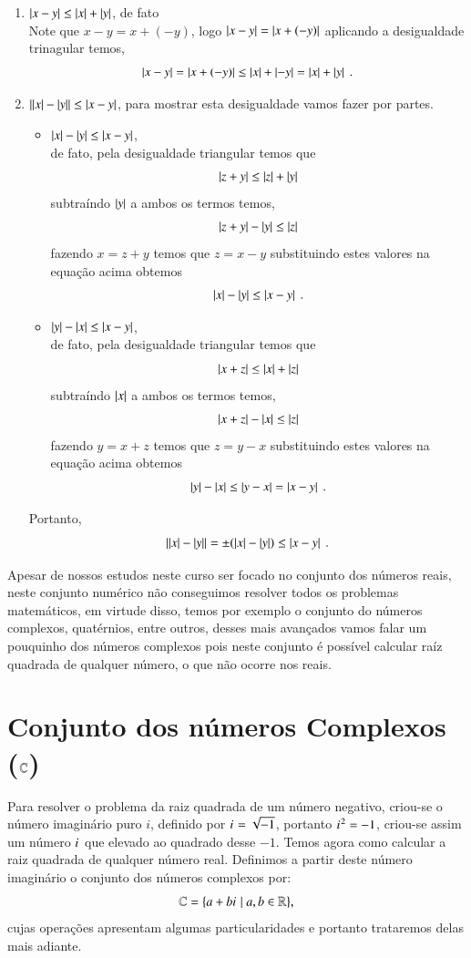 \begin{prop}
\begin{enumerate}
 \item $\left|x-y\right| \leq \left|x\right| + \left|y\right|$, de fato \\
 Note que $x-y= x+ (-y)$, logo $\left|x-y\right|= \left|x+ (-y)\right|$ aplicando a desigualdade trinagular temos,
 \[\left|x-y\right|= \left|x+ (-y)\right| \leq \left|x\right| + \left|-y\right|= \left|x\right| + \left|y\right| \ .\]
 
 \item $\left|\left|x\right| - \left|y\right|\right| \leq \left|x - y\right|$, para mostrar esta desigualdade vamos fazer por partes.
 \begin{itemize}
 \item $\left|x\right| - \left|y\right| \leq \left|x - y\right|$, \\
 de fato, pela desigualdade triangular temos que
 \[\left|z+y\right| \leq \left|z\right| + \left|y\right|\]
 subtraíndo $\left|y\right|$ a ambos os termos temos,
 \[\left|z+y\right| - \left|y\right| \leq \left|z\right|\]
 fazendo $x= z+y$ temos que $z=x-y$ substituindo estes valores na equação acima obtemos
 \[\abs{x} - \abs{y} \leq \abs{x-y} \ . \]
 \item $\left|y\right| - \left|x\right| \leq \left|x - y\right|$, \\
 de fato, pela desigualdade triangular temos que
 \[\left|x+z\right| \leq \left|x\right| + \left|z\right|\]
 subtraíndo $\left|x\right|$ a ambos os termos temos,
 \[\left|x+z\right| - \left|x\right| \leq \left|z\right|\]
 fazendo $y= x+z$ temos que $z=y-x$ substituindo estes valores na equação acima obtemos
 \[\abs{y} - \abs{x} \leq \abs{y-x}= \abs{x-y} \ . \] 
 \end{itemize}
 
 Portanto, 
 \[ \left|\left|x\right| - \left|y\right|\right| = \pm (\left|x\right| - \left|y\right|) \leq \left|x-y\right| \ .\]

\end{enumerate}
\end{prop}




Apesar de nossos estudos neste curso ser focado no conjunto dos números reais, neste conjunto numérico não conseguimos resolver todos os problemas matemáticos, em virtude disso, temos por exemplo o conjunto do números complexos, quatérnios, entre outros, desses mais avançados vamos falar um pouquinho dos números complexos pois neste conjunto é possível calcular raíz quadrada de qualquer número, o que não ocorre nos reais.

\section{Conjunto dos números Complexos (\texorpdfstring{$\mathbb{C}$}{C})}

Para resolver o problema da raiz quadrada de um número negativo, criou-se o número imaginário puro $i$, definido por ${i\mkern1mu}= \sqrt{-1}$, portanto ${i\mkern1mu}^2= -1$, criou-se assim um número ${i\mkern1mu}$ que elevado ao quadrado desse $-1$. Temos agora como calcular a raiz quadrada de qualquer número real. Definimos a partir deste número imaginário o conjunto dos números complexos por:
\[\mathbb{C}= \{a + b{i\mkern1mu} \mid a, b \in \mathbb{R} \} ,\]
cujas operações apresentam algumas particularidades e portanto trataremos delas mais adiante.

